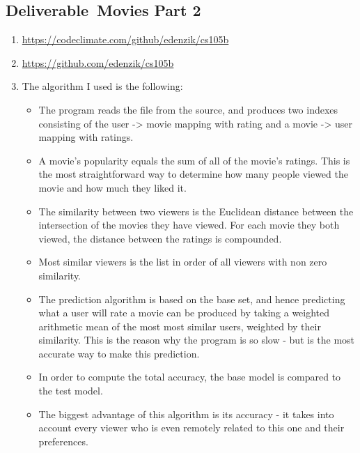 
\renewcommand{\courseNumber}{cs105a}
\renewcommand{\courseTitle}{Software Engineering to Scale}


\renewcommand{\assignmentType}{Deliverable}
\renewcommand{\assignmentNum}{Movies Part 2}
\renewcommand{\assignmentDueDate}{2/9/2015}



\begin{center}\section*{\assignmentType\ \assignmentNum}\end{center}
	\begin{enumerate}
		\item \url{https://codeclimate.com/github/edenzik/cs105b}
		\item \url{https://github.com/edenzik/cs105b}
		\item The algorithm I used is the following:
			\begin{itemize}
				\item The program reads the file from the source, and produces two indexes consisting of the user -> movie mapping with rating and a movie -> user mapping with ratings.
				\item	A movie's popularity equals the sum of all of the movie's ratings. This is the most straightforward way to determine how many people viewed the movie and how much they liked it.
				\item The similarity between two viewers is the Euclidean distance between the intersection of the movies they have viewed. For each movie they both viewed, the distance between the ratings is compounded.
					\item Most similar viewers is the list in order of all viewers with non zero similarity.
						\item The prediction algorithm is based on the base set, and hence predicting what a user will rate a movie can be produced by taking a weighted arithmetic mean of the most most similar users, weighted by their similarity. This is the reason why the program is so slow - but is the most accurate way to make this prediction. 
							\item In order to compute the total accuracy, the base model is compared to the test model.
								\item The biggest advantage of this algorithm is its accuracy - it takes into account every viewer who is even remotely related to this one and their preferences.

\end{itemize}
\end{enumerate}
